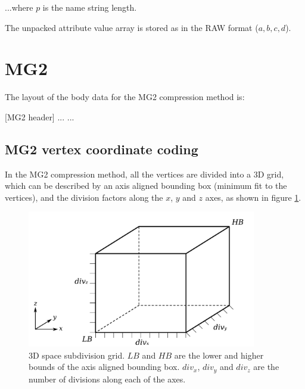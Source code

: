 ...where $p$ is the name string length.

The unpacked attribute value array is stored as in the RAW format ($a, b, c, d$).


\section{MG2}
The layout of the body data for the MG2 compression method is:

[MG2 header]\newline
[Vertices]\newline
[Indices]\newline
[Normals]\newline
[UV map 0]\newline
[UV map 1]\newline
...\newline
[UV map N]\newline
...

\subsection{MG2 vertex coordinate coding}
In the MG2 compression method, all the vertices are divided into a 3D grid,
which can be described by an axis aligned bounding box (minimum fit to the
vertices), and the division factors along the $x$, $y$ and $z$ axes, as shown
in figure \ref{fig:Grid}.

\begin{figure}[pht]
\centering
\includegraphics[width=10.0cm]{grid.pdf}
\caption{3D space subdivision grid. $LB$ and $HB$ are the lower and higher bounds
of the axis aligned bounding box. $div_x$, $div_y$ and $div_z$ are the number
of divisions along each of the axes.}
\label{fig:Grid}
\end{figure}

